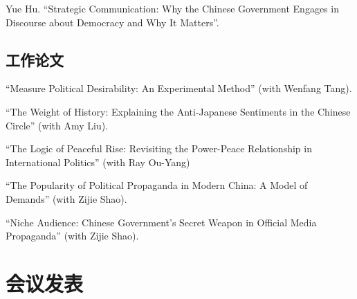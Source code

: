\documentclass[10.5pt,]{article}
\begin{document}
Yue Hu. ``Strategic Communication: Why the Chinese Government Engages in
Discourse about Democracy and Why It Matters''.

\subsection{工作论文}

``Measure Political Desirability: An Experimental Method'' (with Wenfang
Tang).

``The Weight of History: Explaining the Anti-Japanese Sentiments in the
Chinese Circle'' (with Amy Liu).

``The Logic of Peaceful Rise: Revisiting the Power-Peace Relationship in
International Politics'' (with Ray Ou-Yang)

``The Popularity of Political Propaganda in Modern China: A Model of
Demands'' (with Zijie Shao).

``Niche Audience: Chinese Government's Secret Weapon in Official Media
Propaganda'' (with Zijie Shao).

\section{会议发表}
\end{document}
